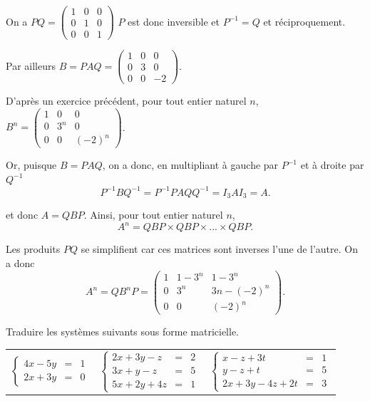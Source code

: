 \documentclass[11pt,fleqn]{book} %
\begin{document}
\begin{solution}On a \(PQ = \begin{pmatrix}1&0&0\\0&1&0\\0&0&1\end{pmatrix}\) \(P\) est donc inversible et \(P^{-1}=Q\) et réciproquement. 

Par ailleurs \( B =PAQ = \begin{pmatrix}1&0&0\\0&3&0\\0&0&-2\end{pmatrix}\).

D'après un exercice précédent, pour tout entier naturel \(n\), \(B^n = \begin{pmatrix}1&0&0\\0&3^n&0\\0&0&(-2)^n\end{pmatrix}\).

Or, puisque \(B=PAQ\), on a donc, en multipliant à gauche par \(P^{-1}\) et à droite par \(Q^{-1}\) 
\[ P^{-1}BQ^{-1} = P^{-1}PAQQ^{-1} = I_3AI_3=A.\]

et donc \(A=QBP\). Ainsi, pour tout entier naturel \(n\), 
\[A^n = QBP \times QBP \times ... \times QBP.\]

Les produits \(PQ\) se simplifient car ces matrices sont inverses l'une de l'autre. On a donc
\[A^n = QB^nP = \begin{pmatrix} 1 & 1-3^n & 1-3^n \\ 0 & 3^n & 3n -(-2)^n \\ 0 & 0 & (-2)^n\end{pmatrix}.\]\end{solution}



\begin{exercise}[topic=mat03]Traduire les systèmes suivants sous forme matricielle.

\begin{tabularx}{\linewidth}{XXX}

$\left\{\begin{array}{rcl} 4x -5y  &= &1 \\ 2x+3y& = &0\end{array}\right.$ & $\left\{\begin{array}{rcl} 2x + 3y - z& = &2 \\ 3x + y -z& =& 5 \\ 5x + 2y +4z &= &1\end{array}\right.$ & $\left\{\begin{array}{rcl} x  - z +3t& = &1 \\ y - z +t &=& 5 \\ 2x + 3y -4z +2t& =& 3\end{array}\right.$\end{tabularx}

\end{exercise}
\end{document}
